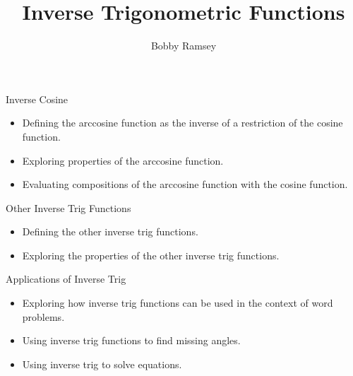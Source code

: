 \documentclass{ximera}
\author{Bobby Ramsey}
\title{Inverse Trigonometric Functions}
\begin{document}
\begin{abstract}
\end{abstract}
\maketitle


\begin{objectives}
	\item Inverse Cosine
		\begin{itemize}
			\item Defining the arccosine function as the inverse of a restriction of the cosine function.
			\item Exploring properties of the arccosine function.
			\item Evaluating compositions of the arccosine function with the cosine function. 
		\end{itemize}
	
	\item Other Inverse Trig Functions
		\begin{itemize}
			\item Defining the other inverse trig functions. 
			\item Exploring the properties of the other inverse trig functions. 
		\end{itemize}

	\item Applications of Inverse Trig
		\begin{itemize}
			\item Exploring how inverse trig functions can be used in the context of word problems. 
			\item Using inverse trig functions to find missing angles. 
			\item Using inverse trig to solve equations. 
		\end{itemize}
\end{objectives}
\end{document}
